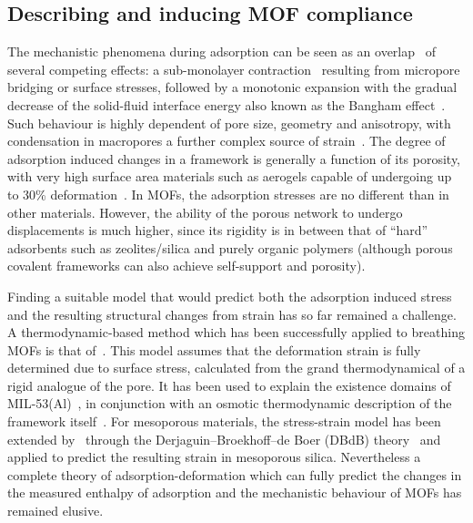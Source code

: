 \subsection{Describing and inducing MOF compliance}

The mechanistic phenomena during adsorption can be 
seen as an overlap~\cite{gorAdsorptionInducedDeformationMesoporous2010}
of several competing effects: a sub-monolayer
contraction~\cite{daceyVolumeChangesSaran1971} resulting
from micropore bridging or surface stresses, followed by a monotonic 
expansion with the gradual decrease of the solid-fluid interface energy
also known as the Bangham 
effect~\cite{banghamExpansionCharcoalAccompanying1928}. 
Such behaviour is highly dependent of pore size, geometry and anisotropy,
with condensation in macropores a further complex source of 
strain~\cite{dolinoAdsorptionStrainsPorous1996, %
ambergSTUDYADSORPTIONHYSTERESIS1952, %
guntherNovelInsightsNanopore2008}. The degree of adsorption induced
changes in a framework is generally a function of its porosity, 
with very high 
surface area materials such as aerogels capable of undergoing up 
to 30\% deformation~\cite{reichenauerNitrogenSorptionAerogels2001}.
In MOFs, the adsorption stresses are no different than in other 
materials. However, the ability of the porous network to undergo
displacements is much higher, since its rigidity is in 
between that of ``hard'' adsorbents such as zeolites/silica and 
purely organic polymers (although porous covalent frameworks can
also achieve self-support and porosity).

Finding a suitable model that would predict both the adsorption
induced stress and the resulting structural changes from strain
has so far remained a challenge. A thermodynamic-based method which
has been successfully applied to breathing MOFs is that 
of~\citet{neimarkStressBasedModelBreathing2010}. This model assumes
that the deformation strain is fully determined due to surface stress,
calculated from the grand thermodynamical of a rigid analogue of
the pore. It has been used to explain the existence 
domains of MIL-53(Al)~\cite{boutinBehaviorFlexibleMIL532010}, in 
conjunction with an osmotic thermodynamic description of 
the framework itself~\cite{coudertThermodynamicsGuestInducedStructural2008}.
For mesoporous materials, the stress-strain model has been extended 
by~\citet{gorAdsorptionInducedDeformationMesoporous2010} through
the Derjaguin–Broekhoff–de Boer (DBdB) 
theory~\cite{broekhoffStudiesPoreSystems1967} and applied to
predict the resulting strain in mesoporous silica.
Nevertheless a complete theory of adsorption-deformation 
which can fully predict the changes in the measured enthalpy of 
adsorption and the mechanistic behaviour of MOFs has remained elusive.

